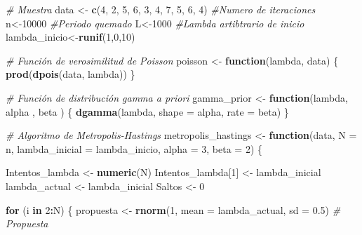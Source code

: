 \documentclass[
]{article}
\newenvironment{Shaded}{\begin{snugshade}}{\end{snugshade}}
\newcommand{\AttributeTok}[1]{\textcolor[rgb]{0.13,0.29,0.53}{#1}}
\newcommand{\CommentTok}[1]{\textcolor[rgb]{0.56,0.35,0.01}{\textit{#1}}}
\newcommand{\ControlFlowTok}[1]{\textcolor[rgb]{0.13,0.29,0.53}{\textbf{#1}}}
\newcommand{\DecValTok}[1]{\textcolor[rgb]{0.00,0.00,0.81}{#1}}
\newcommand{\FloatTok}[1]{\textcolor[rgb]{0.00,0.00,0.81}{#1}}
\newcommand{\FunctionTok}[1]{\textcolor[rgb]{0.13,0.29,0.53}{\textbf{#1}}}
\newcommand{\NormalTok}[1]{#1}
\newcommand{\OtherTok}[1]{\textcolor[rgb]{0.56,0.35,0.01}{#1}}
\newcommand{\SpecialCharTok}[1]{\textcolor[rgb]{0.81,0.36,0.00}{\textbf{#1}}}
\begin{document}
\begin{Shaded}
\begin{Highlighting}[]
\CommentTok{\# Muestra}
\NormalTok{data }\OtherTok{\textless{}{-}} \FunctionTok{c}\NormalTok{(}\DecValTok{4}\NormalTok{, }\DecValTok{2}\NormalTok{, }\DecValTok{5}\NormalTok{, }\DecValTok{6}\NormalTok{, }\DecValTok{3}\NormalTok{, }\DecValTok{4}\NormalTok{, }\DecValTok{7}\NormalTok{, }\DecValTok{5}\NormalTok{, }\DecValTok{6}\NormalTok{, }\DecValTok{4}\NormalTok{)}
\CommentTok{\#Numero de iteraciones}
\NormalTok{n}\OtherTok{\textless{}{-}}\DecValTok{10000}
\CommentTok{\#Periodo quemado}
\NormalTok{L}\OtherTok{\textless{}{-}}\DecValTok{1000}
\CommentTok{\#Lambda artibtrario de inicio}
\NormalTok{lambda\_inicio}\OtherTok{\textless{}{-}}\FunctionTok{runif}\NormalTok{(}\DecValTok{1}\NormalTok{,}\DecValTok{0}\NormalTok{,}\DecValTok{10}\NormalTok{)}

\CommentTok{\# Función de verosimilitud de Poisson}
\NormalTok{poisson }\OtherTok{\textless{}{-}} \ControlFlowTok{function}\NormalTok{(lambda, data) \{}
  \FunctionTok{prod}\NormalTok{(}\FunctionTok{dpois}\NormalTok{(data, lambda))}
\NormalTok{\}}

\CommentTok{\# Función de distribución gamma a priori}
\NormalTok{gamma\_prior }\OtherTok{\textless{}{-}} \ControlFlowTok{function}\NormalTok{(lambda, alpha , beta ) \{}
  \FunctionTok{dgamma}\NormalTok{(lambda, }\AttributeTok{shape =}\NormalTok{ alpha, }\AttributeTok{rate =}\NormalTok{ beta)}
\NormalTok{\}}

\CommentTok{\# Algoritmo de Metropolis{-}Hastings}
\NormalTok{metropolis\_hastings }\OtherTok{\textless{}{-}} \ControlFlowTok{function}\NormalTok{(data, }\AttributeTok{N =}\NormalTok{ n, }\AttributeTok{lambda\_inicial =}\NormalTok{ lambda\_inicio, }
                                \AttributeTok{alpha =} \DecValTok{3}\NormalTok{, }\AttributeTok{beta =} \DecValTok{2}\NormalTok{) \{}
  
  
\NormalTok{  Intentos\_lambda }\OtherTok{\textless{}{-}} \FunctionTok{numeric}\NormalTok{(N)}
\NormalTok{  Intentos\_lambda[}\DecValTok{1}\NormalTok{] }\OtherTok{\textless{}{-}}\NormalTok{ lambda\_inicial}
\NormalTok{  lambda\_actual }\OtherTok{\textless{}{-}}\NormalTok{ lambda\_inicial}
\NormalTok{  Saltos }\OtherTok{\textless{}{-}} \DecValTok{0}
  
  \ControlFlowTok{for}\NormalTok{ (i }\ControlFlowTok{in} \DecValTok{2}\SpecialCharTok{:}\NormalTok{N) \{}
\NormalTok{    propuesta }\OtherTok{\textless{}{-}} \FunctionTok{rnorm}\NormalTok{(}\DecValTok{1}\NormalTok{, }\AttributeTok{mean =}\NormalTok{ lambda\_actual, }\AttributeTok{sd =} \FloatTok{0.5}\NormalTok{)  }\CommentTok{\# Propuesta}
    

\end{Highlighting}
\end{Shaded}
\end{document}
